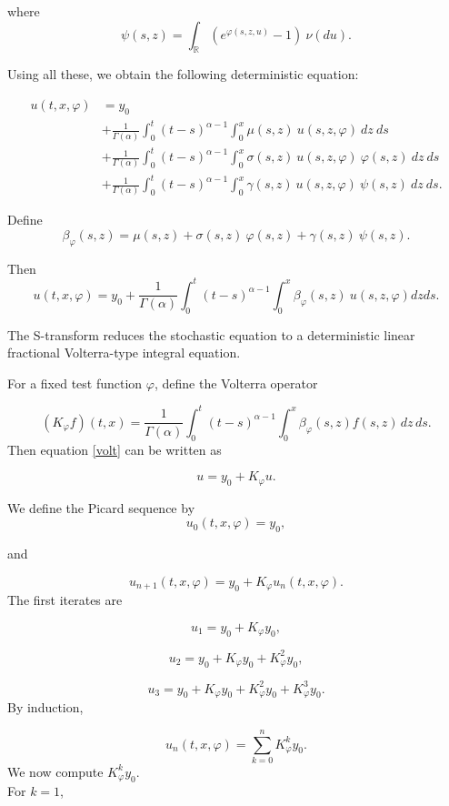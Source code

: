 \documentclass[12pt]{article}%
\numberwithin{equation}{section}
\begin{document}
where
\[
\psi(s,z) = \int_{\mathbb{R}} (e^{\varphi(s,z,u)} - 1)\  \nu(du).
\]

Using all these, we obtain the following deterministic equation:

\begin{equation}
\begin{aligned}
u(t,x,\varphi)
&= y_0 \\
&+ \frac{1}{\Gamma(\alpha)} \int_0^t (t-s)^{\alpha-1}
\int_0^x \mu(s,z)\ u(s,z,\varphi)\  dz\  ds \\
&+ \frac{1}{\Gamma(\alpha)} \int_0^t (t-s)^{\alpha-1}
\int_0^x \sigma(s,z)\ u(s,z,\varphi)\ \varphi(s,z)\  dz\  ds \\
&+ \frac{1}{\Gamma(\alpha)} \int_0^t (t-s)^{\alpha-1}
\int_0^x \gamma(s,z)\ u(s,z,\varphi)\ \psi(s,z)\  dz\  ds.
\end{aligned}
\end{equation}

Define
\[
\beta_\varphi(s,z) = \mu(s,z) + \sigma(s,z)\ \varphi(s,z) + \gamma(s,z)\ \psi(s,z).
\]

Then
\begin{equation}\label{volt}
  u(t,x,\varphi) = y_0 + \frac{1}{\Gamma(\alpha)} \int_0^t (t-s)^{\alpha-1} \int_0^x \beta_\varphi(s,z)\ u(s,z,\varphi) dz  ds.  
\end{equation}


The S-transform reduces the stochastic equation to a deterministic linear fractional Volterra-type integral equation.

For a fixed test function $\varphi$, define the Volterra operator

\[
(K_\varphi f)(t,x)
=
\frac{1}{\Gamma(\alpha)}
\int_0^t (t-s)^{\alpha-1}
\int_0^x
\beta_\varphi(s,z)f(s,z)\,dz\,ds.
\]
Then equation \eqref{volt} can be written as

\[
u=y_0+K_\varphi u.
\]

We define the Picard sequence by
\[
u_0(t,x,\varphi)=y_0,
\]

and

\[
u_{n+1}(t,x,\varphi)
=
y_0+K_\varphi u_n(t,x,\varphi).
\]
The first iterates are

\[
u_1
=
y_0+K_\varphi y_0,
\]

\[
u_2
=
y_0+K_\varphi y_0+K_\varphi^2y_0,
\]

\[
u_3
=
y_0+K_\varphi y_0+K_\varphi^2y_0+K_\varphi^3y_0.
\]
By induction,

\[
u_n(t,x,\varphi)
=
\sum_{k=0}^{n}
K_\varphi^k y_0.
\]
We now compute $K_\varphi^k y_0$.\\ For $k=1$,
\end{document}
